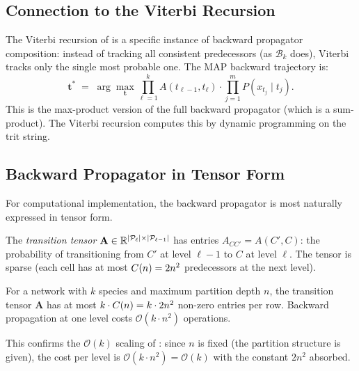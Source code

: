 \subsection{Connection to the Viterbi Recursion}

The Viterbi recursion of  is a specific instance of backward
propagator composition: instead of tracking all consistent predecessors
(as $\mathcal{B}_k$ does), Viterbi tracks only the single most probable one.
The MAP backward trajectory is:
\begin{equation}
    \mathbf{t}^* \;=\; \arg\max_{\mathbf{t}} \prod_{\ell=1}^k A(t_{\ell-1}, t_\ell)
    \cdot \prod_{j=1}^m P(x_{t_j} \mid t_j).
\end{equation}
This is the max-product version of the full backward propagator (which is a
sum-product).  The Viterbi recursion computes this by dynamic programming on
the trit string.

\subsection{Backward Propagator in Tensor Form}

For computational implementation, the backward propagator is most naturally
expressed in tensor form.

\begin{definition}
\label{def:transition-tensor}
The \emph{transition tensor} $\mathbf{A} \in \mathbb{R}^{|\mathcal{P}_\ell|
\times |\mathcal{P}_{\ell-1}|}$ has entries $A_{CC'} = A(C',C)$: the
probability of transitioning from $C'$ at level $\ell-1$ to $C$ at level $\ell$.
The tensor is sparse (each cell has at most $C(n) = 2n^2$ predecessors
at the next level).
\end{definition}

\begin{proposition}
\label{prop:sparse-back}
For a network with $k$ species and maximum partition depth $n$, the transition
tensor $\mathbf{A}$ has at most $k \cdot C(n) = k \cdot 2n^2$
non-zero entries per row.  Backward propagation at one level costs
$\mathcal{O}(k \cdot n^2)$ operations.
\end{proposition}

This confirms the $\mathcal{O}(k)$ scaling of :
since $n$ is fixed (the partition structure is given), the cost per level is
$\mathcal{O}(k \cdot n^2) = \mathcal{O}(k)$ with the constant $2n^2$ absorbed.


